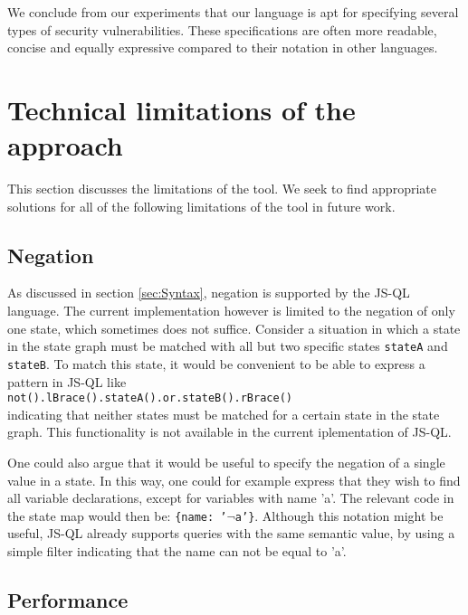  We conclude from our experiments that our language is apt for specifying several types of security vulnerabilities. These specifications are often more readable, concise and equally expressive compared to their notation in other languages. 

\section{Technical limitations of the approach}

This section discusses the limitations of the tool. We seek to find appropriate solutions for all of the following limitations of the tool in future work.

\subsection*{Negation}

As discussed in section \ref{sec:Syntax}, negation is supported by the JS-QL language. The current implementation however is limited to the negation of only one state, which sometimes does not suffice. Consider a situation in which a state in the state graph must be matched with all but two specific states \texttt{stateA} and \texttt{stateB}. To match this state, it would be convenient to be able to express a pattern in JS-QL like \\\texttt{not().lBrace().stateA().or.stateB().rBrace()}\\indicating that neither states must be matched for a certain state in the state graph. This functionality is not available in the current iplementation of JS-QL. 

One could also argue that it would be useful to specify the negation of a single value in a state. In this way, one could for example express that they wish to find all variable declarations, except for variables with name 'a'. The relevant code in the state map would then be: \texttt{\{name: '$\neg$a'\}}. Although this notation might be useful, JS-QL already supports queries with the same semantic value, by using a simple filter indicating that the name can not be equal to 'a'.

\subsection*{Performance}


